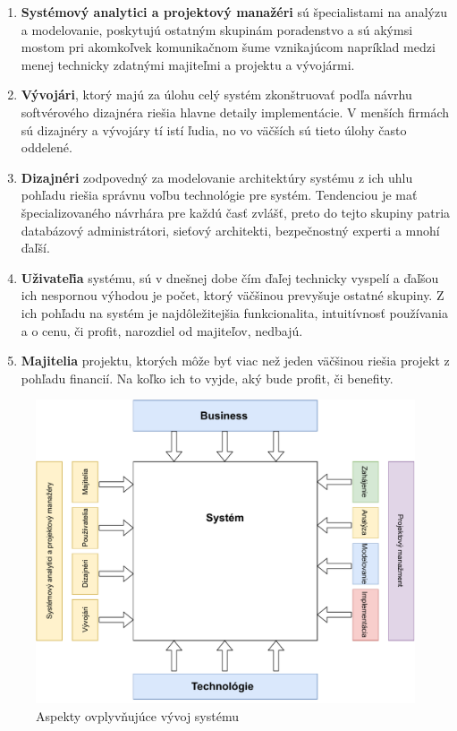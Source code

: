 \begin{enumerate}
	\item \textbf{Systémový analytici a projektový manažéri} sú špecialistami na analýzu a modelovanie, poskytujú ostatným skupinám poradenstvo a sú akýmsi mostom pri akomkoľvek komunikačnom šume vznikajúcom napríklad medzi menej technicky zdatnými majiteľmi a projektu a vývojármi.
	\item \textbf{Vývojári}, ktorý majú za úlohu celý systém zkonštruovať podľa návrhu softvérového dizajnéra riešia hlavne detaily implementácie. V menších firmách sú dizajnéry a vývojáry tí istí ľudia, no vo väčších sú tieto úlohy často oddelené.
	\item \textbf{Dizajnéri} zodpovedný za modelovanie architektúry systému z ich uhlu pohľadu riešia správnu voľbu technológie pre systém. Tendenciou je mať špecializovaného návrhára pre každú časť zvlášť, preto do tejto skupiny patria databázový administrátori, sieťový architekti, bezpečnostný experti a mnohí ďaľší.
	\item \textbf{Uživateľia} systému, sú v dnešnej dobe čím ďaľej technicky vyspelí a ďaľšou ich nespornou výhodou je počet, ktorý väčšinou prevyšuje ostatné skupiny. Z ich pohľadu na systém je najdôležitejšia funkcionalita, intuitívnosť používania a o cenu, či profit, narozdiel od majiteľov, nedbajú.
	\item \textbf{Majitelia} projektu, ktorých môže byť viac než jeden väčšinou riešia projekt z pohľadu financií. Na koľko ich to vyjde, aký bude profit, či benefity.
\end{enumerate}
\begin{figure}[H]
	\centering
	\includegraphics[scale=0.75]{obrazky-figures/TR-system-inputs}
	\caption{Aspekty ovplyvňujúce vývoj systému \cite{whitten2007systems}}
	\label{fig:system-inputs}
\end{figure}

